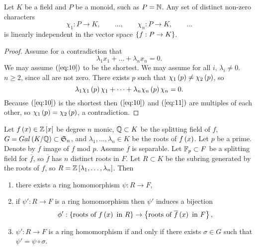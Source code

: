\begin{theorem}
Let $ K $ be a field and $ P $ be a monoid, such as $ P = \mathbb{N} $. Any set of distinct non-zero characters
$$ \chi_1 : P \to K, \qquad \dots, \qquad \chi_n : P \to K, \qquad \dots $$
is linearly independent in the vector space $ \left\{ f : P \to K \right\} $.
\end{theorem}

\begin{proof}
Assume for a contradiction that
\begin{equation}
\label{eq:10}
\lambda_1x_1 + \dots + \lambda_nx_n = 0.
\end{equation}
We may assume $ \left( \ref{eq:10} \right) $ to be the shortest. We may assume for all $ i $, $ \lambda_i \ne 0 $. $ n \ge 2 $, since all are not zero. There exists $ p $ such that $ \chi_1\left( p \right) \ne \chi_2\left( p \right) $, so
\begin{equation}
\label{eq:11}
\lambda_1\chi_1\left( p \right)\chi_1 + \dots + \lambda_n\chi_n\left( p \right)\chi_n = 0.
\end{equation}
Because $ \left( \ref{eq:10} \right) $ is the shortest then $ \left( \ref{eq:10} \right) $ and $ \left( \ref{eq:11} \right) $ are multiples of each other, so $ \chi_1\left( p \right) = \chi_2\left( p \right) $, a contradiction.
\end{proof}

\pagebreak

\begin{theorem}
\label{thm:ringhomomorphism}
Let $ f\left( x \right) \in \mathbb{Z}\left[ x \right] $ be degree $ n $ monic, $ \mathbb{Q} \subset K $ be the splitting field of $ f $, $ G = Gal\left( K / \mathbb{Q} \right) \subset \mathfrak{S}_n $, and $ \lambda_1, \dots, \lambda_n \in K $ be the roots of $ f\left( x \right) $. Let $ p $ be a prime. Denote by $ \overline{f} $ image of $ f $ mod $ p $. Assume $ \overline{f} $ is separable. Let $ \mathbb{F}_p \subset F $ be a splitting field for $ \overline{f} $, so $ \overline{f} $ has $ n $ distinct roots in $ F $. Let $ R \subset K $ be the subring generated by the roots of $ f $, so $ R = \mathbb{Z}\left[ \lambda_1, \dots, \lambda_n \right] $. Then
\begin{enumerate}
\item there exists a ring homomorphism $ \psi : R \to F $,
\item if $ \psi' : R \to F $ is a ring homomorphism then $ \psi' $ induces a bijection
$$ \phi' : \cb{\text{roots of} \ f\rb{x} \ \text{in} \ R} \to \cb{\text{roots of} \ \overline{f}\rb{x} \ \text{in} \ F}, $$
\item $ \psi' : R \to F $ is a ring homomorphism if and only if there exists $ \sigma \in G $ such that $ \psi' = \psi \circ \sigma $.
\end{enumerate}
\end{theorem}

